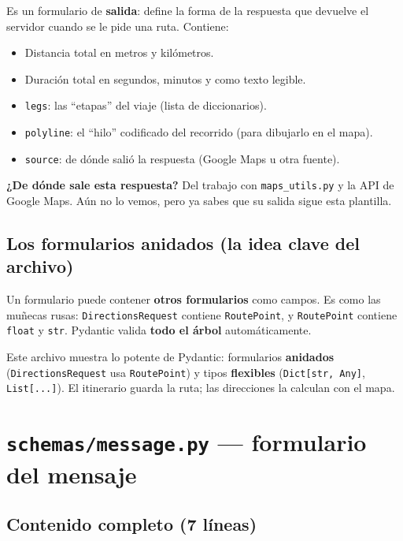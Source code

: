 \documentclass[11pt,a4paper]{article}
\begin{document}
Es un formulario de \textbf{salida}: define la forma de la respuesta que devuelve el servidor
cuando se le pide una ruta. Contiene:
\begin{itemize}
    \item Distancia total en metros y kilómetros.
    \item Duración total en segundos, minutos y como texto legible.
    \item \texttt{legs}: las ``etapas'' del viaje (lista de diccionarios).
    \item \texttt{polyline}: el ``hilo'' codificado del recorrido (para dibujarlo en el mapa).
    \item \texttt{source}: de dónde salió la respuesta (Google Maps u otra fuente).
\end{itemize}

\textbf{¿De dónde sale esta respuesta?} Del trabajo con \texttt{maps\_utils.py} y la API de
Google Maps. Aún no lo vemos, pero ya sabes que su salida sigue esta plantilla.

\subsection{Los formularios \textbf{anidados} (la idea clave del archivo)}

Un formulario puede contener \textbf{otros formularios} como campos. Es como las muñecas rusas:
\texttt{DirectionsRequest} contiene \texttt{RoutePoint}, y \texttt{RoutePoint} contiene
\texttt{float} y \texttt{str}. Pydantic valida \textbf{todo el árbol} automáticamente.

\begin{recuadro}
Este archivo muestra lo potente de Pydantic: formularios \textbf{anidados}
(\texttt{DirectionsRequest} usa \texttt{RoutePoint}) y tipos \textbf{flexibles}
(\texttt{Dict[str, Any]}, \texttt{List[...]}). El itinerario guarda la ruta; las direcciones
la calculan con el mapa.
\end{recuadro}

\section{\texttt{schemas/message.py} --- formulario del mensaje}

\subsection{Contenido completo (7 líneas)}
\end{document}
